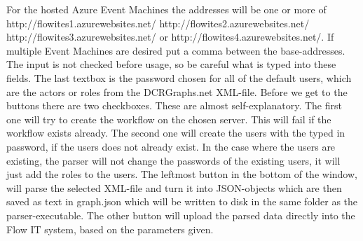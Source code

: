 For the hosted Azure Event Machines the addresses will be one or more of http://flowites1.azurewebsites.net/ http://flowites2.azurewebsites.net/ http://flowites3.azurewebsites.net/ or http://flowites4.azurewebsites.net/. If multiple Event Machines are desired put a comma between the base-addresses. The input is not checked before usage, so be careful what is typed into these fields. \newline
The last textbox is the password chosen for all of the default users, which are the actors or roles from the DCRGraphs.net XML-file. \newline
Before we get to the buttons there are two checkboxes. These are almost self-explanatory. The first one will try to create the workflow on the chosen server. This will fail if the workflow exists already. \newline
The second one will create the users with the typed in password, if the users does not already exist. In the case where the users are existing, the parser will not change the passwords of the existing users, it will just add the roles to the users. \newline
The leftmost button in the bottom of the window, will parse the selected XML-file and turn it into JSON-objects which are then saved as text in graph.json which will be written to disk in the same folder as the parser-executable. \newline
The other button will upload the parsed data directly into the Flow IT system, based on the parameters given.
